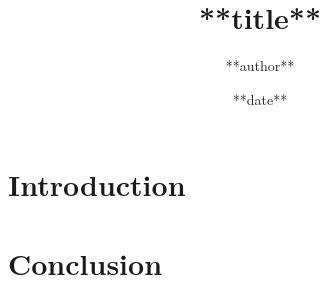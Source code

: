 \documentclass[11pt,a4paper]{report}
\title{**title**}
\author{**author**}
\date{**date**}
\begin{document}
\maketitle
\tableofcontents

\chapter{Introduction}

\chapter{Conclusion}
\end{document}
